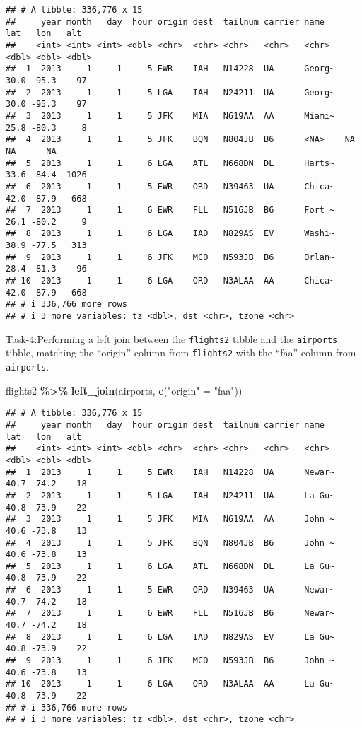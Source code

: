 \documentclass[
]{article}
\newenvironment{Shaded}{\begin{snugshade}}{\end{snugshade}}
\newcommand{\FunctionTok}[1]{\textcolor[rgb]{0.13,0.29,0.53}{\textbf{#1}}}
\newcommand{\NormalTok}[1]{#1}
\newcommand{\OtherTok}[1]{\textcolor[rgb]{0.56,0.35,0.01}{#1}}
\newcommand{\SpecialCharTok}[1]{\textcolor[rgb]{0.81,0.36,0.00}{\textbf{#1}}}
\newcommand{\StringTok}[1]{\textcolor[rgb]{0.31,0.60,0.02}{#1}}
\begin{document}
\begin{verbatim}
## # A tibble: 336,776 x 15
##     year month   day  hour origin dest  tailnum carrier name     lat   lon   alt
##    <int> <int> <int> <dbl> <chr>  <chr> <chr>   <chr>   <chr>  <dbl> <dbl> <dbl>
##  1  2013     1     1     5 EWR    IAH   N14228  UA      Georg~  30.0 -95.3    97
##  2  2013     1     1     5 LGA    IAH   N24211  UA      Georg~  30.0 -95.3    97
##  3  2013     1     1     5 JFK    MIA   N619AA  AA      Miami~  25.8 -80.3     8
##  4  2013     1     1     5 JFK    BQN   N804JB  B6      <NA>    NA    NA      NA
##  5  2013     1     1     6 LGA    ATL   N668DN  DL      Harts~  33.6 -84.4  1026
##  6  2013     1     1     5 EWR    ORD   N39463  UA      Chica~  42.0 -87.9   668
##  7  2013     1     1     6 EWR    FLL   N516JB  B6      Fort ~  26.1 -80.2     9
##  8  2013     1     1     6 LGA    IAD   N829AS  EV      Washi~  38.9 -77.5   313
##  9  2013     1     1     6 JFK    MCO   N593JB  B6      Orlan~  28.4 -81.3    96
## 10  2013     1     1     6 LGA    ORD   N3ALAA  AA      Chica~  42.0 -87.9   668
## # i 336,766 more rows
## # i 3 more variables: tz <dbl>, dst <chr>, tzone <chr>
\end{verbatim}

Task-4:Performing a left join between the \texttt{flights2} tibble and
the \texttt{airports} tibble, matching the ``origin'' column from
\texttt{flights2} with the ``faa'' column from \texttt{airports}.

\begin{Shaded}
\begin{Highlighting}[]
\NormalTok{flights2 }\SpecialCharTok{\%\textgreater{}\%} 
  \FunctionTok{left\_join}\NormalTok{(airports, }\FunctionTok{c}\NormalTok{(}\StringTok{"origin"} \OtherTok{=} \StringTok{"faa"}\NormalTok{))}
\end{Highlighting}
\end{Shaded}

\begin{verbatim}
## # A tibble: 336,776 x 15
##     year month   day  hour origin dest  tailnum carrier name     lat   lon   alt
##    <int> <int> <int> <dbl> <chr>  <chr> <chr>   <chr>   <chr>  <dbl> <dbl> <dbl>
##  1  2013     1     1     5 EWR    IAH   N14228  UA      Newar~  40.7 -74.2    18
##  2  2013     1     1     5 LGA    IAH   N24211  UA      La Gu~  40.8 -73.9    22
##  3  2013     1     1     5 JFK    MIA   N619AA  AA      John ~  40.6 -73.8    13
##  4  2013     1     1     5 JFK    BQN   N804JB  B6      John ~  40.6 -73.8    13
##  5  2013     1     1     6 LGA    ATL   N668DN  DL      La Gu~  40.8 -73.9    22
##  6  2013     1     1     5 EWR    ORD   N39463  UA      Newar~  40.7 -74.2    18
##  7  2013     1     1     6 EWR    FLL   N516JB  B6      Newar~  40.7 -74.2    18
##  8  2013     1     1     6 LGA    IAD   N829AS  EV      La Gu~  40.8 -73.9    22
##  9  2013     1     1     6 JFK    MCO   N593JB  B6      John ~  40.6 -73.8    13
## 10  2013     1     1     6 LGA    ORD   N3ALAA  AA      La Gu~  40.8 -73.9    22
## # i 336,766 more rows
## # i 3 more variables: tz <dbl>, dst <chr>, tzone <chr>
\end{verbatim}
\end{document}
